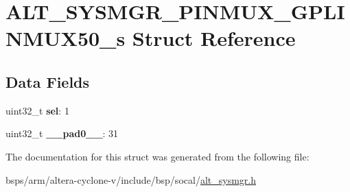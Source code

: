 \hypertarget{structALT__SYSMGR__PINMUX__GPLINMUX50__s}{}\section{A\+L\+T\+\_\+\+S\+Y\+S\+M\+G\+R\+\_\+\+P\+I\+N\+M\+U\+X\+\_\+\+G\+P\+L\+I\+N\+M\+U\+X50\+\_\+s Struct Reference}
\label{structALT__SYSMGR__PINMUX__GPLINMUX50__s}
\subsection*{Data Fields}
\begin{DoxyCompactItemize}
\item 
\mbox{\label{structALT__SYSMGR__PINMUX__GPLINMUX50__s_a7aec0100cc33fa8c8ac91d0ef974d318}} 
uint32\+\_\+t {\bfseries sel}\+: 1
\item 
\mbox{\label{structALT__SYSMGR__PINMUX__GPLINMUX50__s_a425cc4237400800842ae027496e15496}} 
uint32\+\_\+t {\bfseries \+\_\+\+\_\+pad0\+\_\+\+\_\+}\+: 31
\end{DoxyCompactItemize}


The documentation for this struct was generated from the following file\+:\begin{DoxyCompactItemize}
\item 
bsps/arm/altera-\/cyclone-\/v/include/bsp/socal/\mbox{\hyperlink{alt__sysmgr_8h}{alt\+\_\+sysmgr.\+h}}\end{DoxyCompactItemize}
